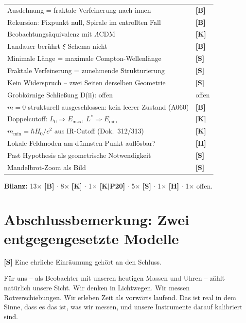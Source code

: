 \begin{center}
\begin{longtable}{@{}p{}l@{}}
		Ausdehnung = fraktale Verfeinerung nach innen & \textbf{[B]} \\
		Rekursion: Fixpunkt null, Spirale im entrollten Fall & \textbf{[B]} \\
		Beobachtungsäquivalenz mit $\Lambda$CDM & \textbf{[K]} \\
		Landauer berührt $\xi$-Schema nicht & \textbf{[B]} \\
		Minimale Länge = maximale Compton-Wellenlänge & \textbf{[S]} \\
		Fraktale Verfeinerung = zunehmende Strukturierung & \textbf{[S]} \\
		Kein Widerspruch – zwei Seiten derselben Geometrie & \textbf{[S]} \\
		Grobkörnige Schließung D(ii): offen & offen \\
		$m=0$ strukturell ausgeschlossen: kein leerer Zustand (A060) & \textbf{[B]} \\
		Doppelcutoff: $L_0 \Rightarrow E_\text{max}$, $L^* \Rightarrow E_\text{min}$ & \textbf{[K]} \\
		$m_\text{min} = \hbar H_0/c^2$ aus IR-Cutoff (Dok.~312/313) & \textbf{[K]} \\
		Lokale Feldmoden am dünnsten Punkt auflösbar? & \textbf{[H]} \\
		Past Hypothesis als geometrische Notwendigkeit & \textbf{[S]} \\
		Mandelbrot-Zoom als Bild & \textbf{[S]} \\
		\bottomrule
	\end{longtable}
\end{center}

\textbf{Bilanz:} 13$\times$ \textbf{[B]} $\cdot$
8$\times$ \textbf{[K]} $\cdot$
1$\times$ \textbf{[K$|$P20]} $\cdot$
5$\times$ \textbf{[S]} $\cdot$
1$\times$ \textbf{[H]} $\cdot$
1$\times$ offen.

\section{Abschlussbemerkung: Zwei entgegengesetzte Modelle}

\textbf{[S]} Eine ehrliche Einräumung gehört an den Schluss.

Für uns – als Beobachter mit unseren heutigen Massen und Uhren
– zählt natürlich unsere Sicht. Wir denken in Lichtwegen. Wir
messen Rotverschiebungen. Wir erleben Zeit als vorwärts laufend.
Das ist real in dem Sinne, dass es das ist, was wir messen, und
unsere Instrumente darauf kalibriert sind.

